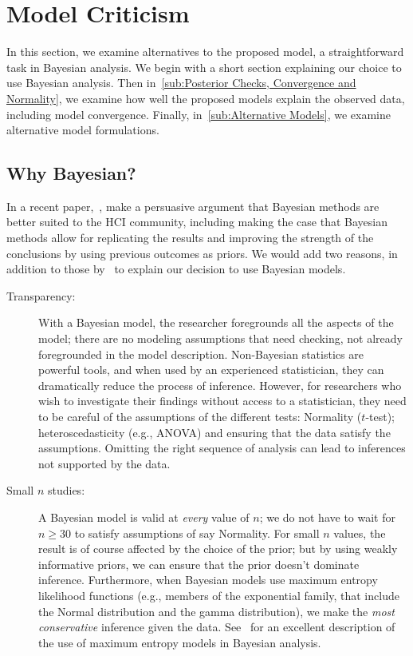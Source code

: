 
\section{Model Criticism}
\label{sec:Model Criticism}

In this section, we examine alternatives to the proposed model, a straightforward task in Bayesian analysis. We begin with a short section explaining our choice to use Bayesian analysis. Then in~\ref{sub:Posterior Checks, Convergence and Normality}, we examine how well the proposed models explain the observed data, including model convergence. Finally, in~\ref{sub:Alternative Models}, we examine alternative model formulations.

\subsection{Why Bayesian?}
\label{sub:Why Bayesian?}
In a recent paper,~\textcite{Kay2016}, make a persuasive argument that Bayesian methods are better suited to the HCI community, including making the case that Bayesian methods allow for replicating the results and improving the strength of the conclusions by using previous outcomes as priors. We would add two reasons, in addition to those by~\textcite{Kay2016} to explain our decision to use Bayesian models. 
\begin{description}
    \item[Transparency:] With a Bayesian model, the researcher foregrounds all the aspects of the model; there are no modeling assumptions that need checking, not already foregrounded in the model description. Non-Bayesian statistics are powerful tools, and when used by an experienced statistician, they can dramatically reduce the process of inference. However, for researchers who wish to investigate their findings without access to a statistician, they need to be careful of the assumptions of the different tests: Normality ($t$-test); heteroscedasticity (e.g., ANOVA) and ensuring that the data satisfy the assumptions. Omitting the right sequence of analysis can lead to inferences not supported by the data.
    \item[Small $n$ studies:] A Bayesian model is valid at \textit{every} value of $n$; we do not have to wait for $n\geq 30$ to satisfy assumptions of say Normality. For small $n$ values, the result is of course affected by the choice of the prior; but by using weakly informative priors, we can ensure that the prior doesn't dominate inference. Furthermore, when Bayesian models use maximum entropy likelihood functions (e.g., members of the exponential family, that include the Normal distribution and the gamma distribution), we make the \textit{most conservative} inference given the data. See~\textcite[][Chapter 9]{McElreath2015} for an excellent description of the use of maximum entropy models in Bayesian analysis.
\end{description}


